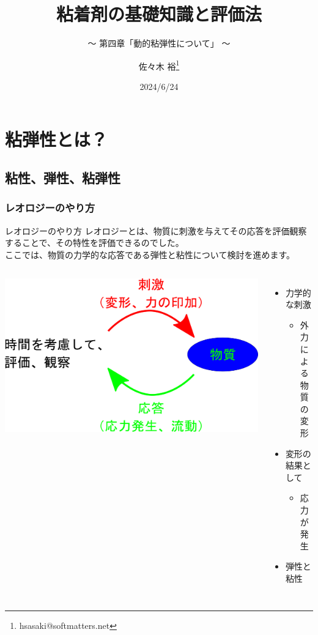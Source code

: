 \documentclass[unicode,12pt]{beamer}%
\title{粘着剤の基礎知識と評価法}
\subtitle{～ 第四章「動的粘弾性について」 ～}
\author[SDL Inc. 佐々木]{佐々木 裕\thanks{hsasaki@softmatters.net}}
\institute[]{元 東亞合成株式会社\\ソフトマターデザインラボ合同会社}
\date{2024/6/24}
\begin{document}
\maketitle

\begin{frame} 
    \tableofcontents[]
\end{frame} 

\section{粘弾性とは？}
\subsection{粘性、弾性、粘弾性}
\begin{frame}
	\frametitle{レオロジーのやり方}
	\begin{block}{レオロジーのやり方}
		レオロジーとは、物質に刺激を与えてその応答を評価観察することで、その特性を評価できるのでした。\\
		ここでは、物質の力学的な応答である弾性と粘性について検討を進めます。
	\end{block}
	\begin{columns}[T, onlytextwidth]
			\includegraphics[width=\textwidth]{Rheo_method.png}
			\begin{itemize}
				\item 力学的な刺激
				\begin{itemize}
					\item 外力による\\物質の変形
				\end{itemize}
				\item 変形の結果として
				\begin{itemize}
					\item 応力が発生
				\end{itemize}
				\item 弾性と粘性
			\end{itemize}
	\end{columns}
\end{frame}
\end{document}
